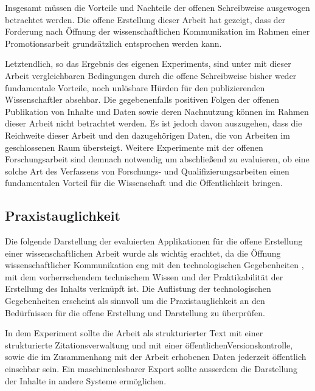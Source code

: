 Insgesamt müssen die Vorteile und Nachteile der offenen Schreibweise ausgewogen betrachtet werden. Die offene Erstellung dieser Arbeit hat gezeigt, dass der Forderung nach Öffnung der wissenschaftlichen Kommunikation im Rahmen einer Promotionsarbeit grundsätzlich entsprochen werden kann.

Letztendlich, so das Ergebnis des eigenen Experiments, sind unter mit dieser Arbeit vergleichbaren Bedingungen durch die offene Schreibweise bisher weder fundamentale Vorteile, noch unlösbare Hürden für den publizierenden Wissenschaftler absehbar. Die gegebenenfalls positiven Folgen der offenen Publikation von Inhalte und Daten sowie deren Nachnutzung können im Rahmen dieser Arbeit nicht betrachtet werden. Es ist jedoch davon auszugehen, dass die Reichweite dieser Arbeit und den dazugehörigen Daten, die von Arbeiten im geschlossenen Raum übersteigt. Weitere Experimente mit der offenen Forschungsarbeit sind demnach notwendig um abschließend zu evaluieren, ob eine solche Art des Verfassens von Forschungs- und Qualifizierungsarbeiten einen fundamentalen Vorteil für die Wissenschaft und die Öffentlichkeit bringen.

\subsection{Praxistauglichkeit}

Die folgende Darstellung der evaluierten Applikationen für die offene Erstellung einer wissenschaftlichen Arbeit wurde als wichtig erachtet, da die Öffnung wissenschaftlicher Kommunikation eng mit den technologischen Gegebenheiten \cite{naeder_2010_open}, mit dem vorherrschendem technischem Wissen und der Praktikabilität der Erstellung des Inhalts verknüpft ist. Die Auflistung der technologischen Gegebenheiten erscheint als sinnvoll um die Praxistauglichkeit an den Bedürfnissen für die offene Erstellung und Darstellung zu überprüfen.

In dem Experiment sollte die Arbeit als strukturierter Text mit einer strukturierte Zitationsverwaltung und mit einer öffentlichenVersionskontrolle, sowie die im Zusammenhang mit der Arbeit erhobenen Daten jederzeit öffentlich einsehbar sein. Ein maschinenlesbarer Export sollte ausserdem die Darstellung der Inhalte in andere Systeme ermöglichen.

